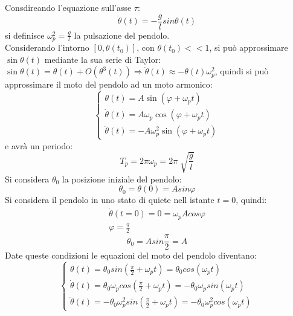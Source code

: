 \documentclass{article}
\numberwithin{equation}{subsection}
\begin{document}
Consdireando l'equazione sull'asse $\tau$: 
\begin{equation}
    \ddot\theta(t)=-\displaystyle\frac{g}{l}sin\theta(t)
\end{equation}
si definisce $\displaystyle\omega_p^{2}=\frac{g}{l}$ la 
pulsazione del pendolo.\\
Considerando l'intorno $[0,\theta(t_0)]$, 
con $\theta(t_0) << 1$, 
si può approssimare $\sin\theta(t)$ mediante la sua serie di Taylor: 
$\sin\theta(t) = \theta(t)+O(\theta^{3}(t))\Rightarrow\ddot\theta(t)\approx-\theta(t)\omega_p^{2}$, 
quindi si può approssimare il moto del pendolo ad un moto 
armonico: 
\begin{equation*}
    \begin{cases}
        \theta(t)=A\sin(\varphi+\omega_pt)\\
        \dot\theta(t)=A\omega_p\cos(\varphi+\omega_pt)\\
        \ddot\theta(t)=-A\omega_p^{2}\sin(\varphi+\omega_pt)
    \end{cases}
\end{equation*}
e avrà un periodo:
\begin{equation} 
    T_p =2\pi\omega_p=2\pi\displaystyle\sqrt[]{\frac{g}{l}}
\end{equation}
Si considera $\theta_0$ la posizione iniziale del 
pendolo: 
\begin{equation*}
    \theta_0=\theta(0)=Asin\varphi
\end{equation*}
Si considera il pendolo in uno stato di quiete nell istante $t=0$, 
quindi:
\begin{gather*}
    \dot\theta(t=0)=0=\omega_pAcos\varphi\\
    \varphi=\displaystyle\frac{\pi}{2}
\end{gather*}
\begin{equation}
    \theta_0=Asin\frac{\pi}{2}=A
\end{equation}
Date queste condizioni le equazioni del moto del pendolo diventano: 
\begin{equation*}
    \begin{cases}
        \displaystyle\theta(t)=\theta_0sin\left(\frac{\pi}{2}+\omega_pt\right)=\theta_0cos(\omega_pt)\\
        \displaystyle\dot\theta(t)=\theta_0\omega_pcos\left(\frac{\pi}{2}+\omega_pt\right)=-\theta_0\omega_psin(\omega_pt)\\
        \displaystyle\ddot\theta(t)=-\theta_0\omega_p^{2}sin\left(\frac{\pi}{2}+\omega_pt\right)=-\theta_0\omega_p^{2}cos(\omega_pt)
    \end{cases}
\end{equation*}
\end{document}
